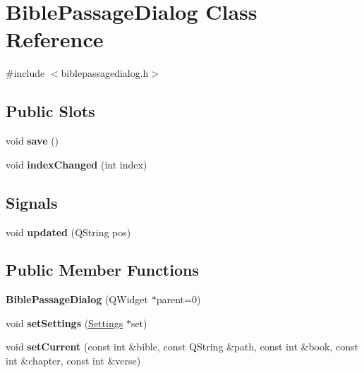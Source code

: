 \hypertarget{classBiblePassageDialog}{
\section{BiblePassageDialog Class Reference}
\label{classBiblePassageDialog}
}


{\ttfamily \#include $<$biblepassagedialog.h$>$}\subsection*{Public Slots}
\begin{DoxyCompactItemize}
\item 
\hypertarget{classBiblePassageDialog_a8a9b3d5faed1129b3b976dccc3f291dc}{
void {\bfseries save} ()}
\label{classBiblePassageDialog_a8a9b3d5faed1129b3b976dccc3f291dc}

\item 
\hypertarget{classBiblePassageDialog_a6a0743c2014edfb1a01d7973c38b4704}{
void {\bfseries indexChanged} (int index)}
\label{classBiblePassageDialog_a6a0743c2014edfb1a01d7973c38b4704}

\end{DoxyCompactItemize}
\subsection*{Signals}
\begin{DoxyCompactItemize}
\item 
\hypertarget{classBiblePassageDialog_acbbdf41e16d8d457b9ed3dab37e7b2ea}{
void {\bfseries updated} (QString pos)}
\label{classBiblePassageDialog_acbbdf41e16d8d457b9ed3dab37e7b2ea}

\end{DoxyCompactItemize}
\subsection*{Public Member Functions}
\begin{DoxyCompactItemize}
\item 
\hypertarget{classBiblePassageDialog_a987ec648297e190ef0d8f9f3bf064430}{
{\bfseries BiblePassageDialog} (QWidget $\ast$parent=0)}
\label{classBiblePassageDialog_a987ec648297e190ef0d8f9f3bf064430}

\item 
\hypertarget{classBiblePassageDialog_a7ad654b6149f0b3ce57ca2019873a3fb}{
void {\bfseries setSettings} (\hyperlink{classSettings}{Settings} $\ast$set)}
\label{classBiblePassageDialog_a7ad654b6149f0b3ce57ca2019873a3fb}

\item 
\hypertarget{classBiblePassageDialog_ae571d538543805777f69954f2d29308e}{
void {\bfseries setCurrent} (const int \&bible, const QString \&path, const int \&book, const int \&chapter, const int \&verse)}
\label{classBiblePassageDialog_ae571d538543805777f69954f2d29308e}

\end{DoxyCompactItemize}
